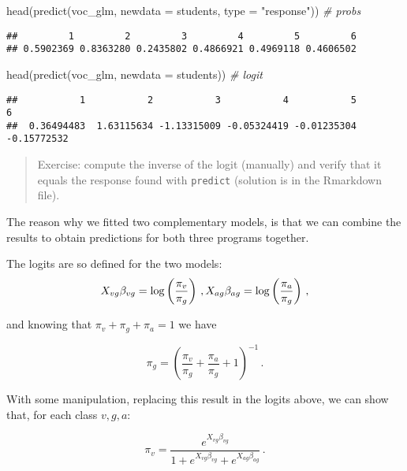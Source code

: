 \documentclass[
  oneside]{book}
\newenvironment{Shaded}{\begin{snugshade}}{\end{snugshade}}
\newcommand{\AttributeTok}[1]{\textcolor[rgb]{0.77,0.63,0.00}{#1}}
\newcommand{\CommentTok}[1]{\textcolor[rgb]{0.56,0.35,0.01}{\textit{#1}}}
\newcommand{\FunctionTok}[1]{\textcolor[rgb]{0.00,0.00,0.00}{#1}}
\newcommand{\NormalTok}[1]{#1}
\newcommand{\StringTok}[1]{\textcolor[rgb]{0.31,0.60,0.02}{#1}}
\begin{document}
\begin{Shaded}
\begin{Highlighting}[]
\FunctionTok{head}\NormalTok{(}\FunctionTok{predict}\NormalTok{(voc\_glm, }\AttributeTok{newdata =}\NormalTok{ students, }\AttributeTok{type =} \StringTok{"response"}\NormalTok{)) }\CommentTok{\# probs}
\end{Highlighting}
\end{Shaded}

\begin{verbatim}
##         1         2         3         4         5         6 
## 0.5902369 0.8363280 0.2435802 0.4866921 0.4969118 0.4606502
\end{verbatim}

\begin{Shaded}
\begin{Highlighting}[]
\FunctionTok{head}\NormalTok{(}\FunctionTok{predict}\NormalTok{(voc\_glm, }\AttributeTok{newdata =}\NormalTok{ students)) }\CommentTok{\# logit}
\end{Highlighting}
\end{Shaded}

\begin{verbatim}
##           1           2           3           4           5           6 
##  0.36494483  1.63115634 -1.13315009 -0.05324419 -0.01235304 -0.15772532
\end{verbatim}

\begin{quote}
Exercise: compute the inverse of the logit (manually) and verify that
it equals the response found with \texttt{predict} (solution is in the Rmarkdown
file).
\end{quote}

The reason why we fitted two complementary models, is that we can combine
the results to obtain predictions for both three programs together.

The logits are so defined for the two models:
\[
X_{vg}\beta_{vg} = \log\left(\frac{\pi_{v}}{\pi_g}\right)\,,\\
X_{ag}\beta_{ag} = \log\left(\frac{\pi_{a}}{\pi_g}\right)\,,
\]

and knowing that \(\pi_v + \pi_g + \pi_a = 1\)
we have

\[
\pi_g = \left(\frac{\pi_v}{\pi_g} + \frac{\pi_a}{\pi_g} + 1\right)^{-1}\,.
\]

With some manipulation, replacing this result in the
logits above, we can show that, for each class \(v, g, a\):

\[
\pi_v = \frac{e^{X_{vg}\beta_{vg}}}{1 + e^{X_{vg}\beta_{vg}} + e^{X_{ag}\beta_{ag}}}\,.
\]
\end{document}
